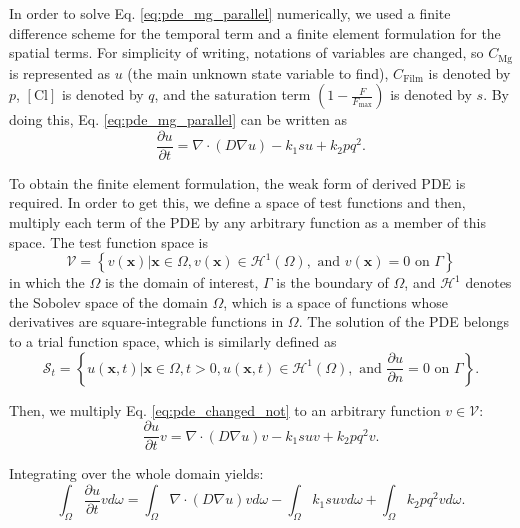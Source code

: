 In order to solve Eq. \ref{eq:pde_mg_parallel} numerically, we used a finite difference scheme for the temporal term and a finite element formulation for the spatial terms. For simplicity of writing, notations of variables are changed, so $C_\mathrm{Mg}$ is represented as $u$ (the main unknown state variable to find), $C_\mathrm{Film}$ is denoted by $p$, $[\mathrm{Cl}]$ is denoted by $q$, and the saturation term $(1-\frac{F}{F_{\max }})$ is denoted by $s$. By doing this, Eq. \ref{eq:pde_mg_parallel} can be written as
\begin{equation} \label{eq:pde_changed_not}
\frac{\partial u}{\partial t}=\nabla \cdot (D   \nabla u)-k_{1} s u+k_{2} p q^{2}.
\end{equation}

To obtain the finite element formulation, the weak form of derived \gls{PDE} is required. In order to get this, we define a space of test functions and then, multiply each term of the \gls{PDE} by any arbitrary function as a member of this space. The test function space is
\begin{equation} \label{eq:function_space}
\mathcal{V}=\left\{v(\mathbf{x}) | \mathbf{x} \in {\Omega}, v(\mathbf{x}) \in \mathcal{H}^{1}(\Omega), \text { and } v(\mathbf{x})=0 \text { on } \Gamma\right\}
\end{equation}
in which the $\Omega$ is the domain of interest, $\Gamma$ is the boundary of $\Omega$, and $\mathcal{H}^{1}$ denotes the Sobolev space of the domain $\Omega$, which is a space of functions whose derivatives are square-integrable functions in $\Omega$. The solution of the \gls{PDE} belongs to a trial function space, which is similarly defined as
\begin{equation} \label{eq:trial_domain}
\mathcal{S}_{t}=\left\{u(\mathbf{x}, t) | \mathbf{x} \in \Omega, t>0, u(\mathbf{x}, t) \in \mathcal{H}^{1}(\Omega), \text { and } \frac{\partial u}{\partial n}=0 \text { on } \Gamma\right\}.
\end{equation}

Then, we multiply Eq. \ref{eq:pde_changed_not} to an arbitrary function $v \in \mathcal{V}$:
\begin{equation}
\frac{\partial u}{\partial t} v=\nabla \cdot (D  \nabla u) v-k_{1} s u v+k_{2} p q^{2} v.
\end{equation}

\noindent Integrating over the whole domain yields:
\begin{equation} \label{eq:int_first}
\int_{\Omega} \frac{\partial u}{\partial t} v d \omega=\int_{\Omega} \nabla \cdot (D  \nabla u) v d \omega-\int_{\Omega} k_{1} s u v d \omega+\int_{\Omega} k_{2} p q^{2} v d \omega.
\end{equation}

